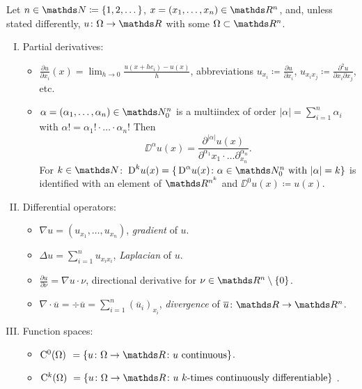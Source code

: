 \newpage
\begin{ntion}
  Let $n \in \N \coloneqq \{1,2,\dots\}$, $x  = (x_1,\dots, x_n) \in \R^n$, and, unless stated differently, $u \colon \Omega \to \R$ with some $\Omega \subset \R^n$.
  \begin{enumerate}[I)]
    \item Partial derivatives:
      \begin{itemize}
        \item $\frac{\partial u}{\partial x_i}(x) = \lim_{h \to 0} \frac{u(x + he_i) - u(x)}{h}$, abbreviations $u_{x_i} \coloneq \frac{\partial u}{\partial x_i}$, $u_{x_i x_j} \coloneqq \frac{\partial^2 u}{\partial x_i \partial x_j}$, etc.
        \item $\alpha = (\alpha_1,\dots,\alpha_n) \in \N_0^n$ is a multiindex of order $|\alpha| = \sum_{i = 1}^n \alpha_i$ with $\alpha! = \alpha_1! \cdot\ldots\cdot\alpha_n!$
          Then
          $$
          \DD^\alpha u(x) = \frac{\partial^|\alpha| u(x)}{\partial^{\alpha_1} x_1 \cdot \ldots \partial^{\alpha_n}_{x_n}}.
          $$
          For $k \in \N$: $\DD^k u(x) = \{\DD^\alpha u(x) \colon \alpha \in \N_0^n \text{ with } |\alpha| = k \}$ is identified with an element of $\R^{n^k}$ and $\DD^0 u(x) \coloneqq u(x)$.
      \end{itemize}

    \item Differential operators:
      \begin{itemize}
        \item $\nabla u = (u_{x_1}, \dots, u_{x_n})$, \emph{gradient} of $u$.
        \item $\Delta u = \sum_{i = 1}^n u_{x_i x_i}$, \emph{Laplacian} of $u$.
        \item $\frac{\partial u}{\partial \nu} = \nabla u \cdot \nu$, directional derivative for $\nu \in \R^n \setminus\{0\}$.
        \item $\nabla \cdot \overline u = \div \overline u = \sum_{i = 1}^n (\overline u_i)_{x_i}$, \emph{divergence} of $\overline u \colon \R \to \R^n$.
      \end{itemize}


    \item Function spaces:
      \begin{itemize}
        \item $\CC^0(\Omega)
          \nicestspace 
          = \{u \colon \Omega \to \R \colon u \text{ continuous}\}$.
        \item $\CC^k(\Omega)
          \nicerspace 
          = \{u \colon \Omega \to \R \colon u \text{ $k$-times continuously differentiable}\}$ .
          

\end{itemize}
\end{enumerate}
\end{ntion}

